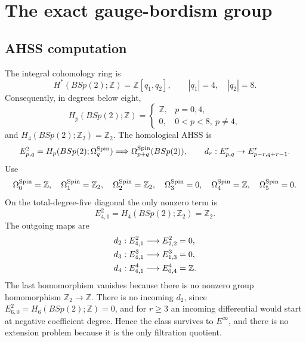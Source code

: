 \documentclass[11pt]{article}
\theoremstyle{definition}
\theoremstyle{remark}
\newcommand{\ZZ}{\mathbb Z}
\begin{document}
\section{The exact gauge-bordism group}

\subsection{AHSS computation}

The integral cohomology ring is
\begin{equation}
 H^*(BSp(2);\ZZ)=\ZZ[q_1,q_2],
 \qquad |q_1|=4,\quad |q_2|=8.
 \label{eq:bsp-cohomology}
\end{equation}
Consequently, in degrees below eight,
\begin{equation}
 H_p(BSp(2);\ZZ)=
 \begin{cases}
 \ZZ,&p=0,4,\\
 0,&0<p<8,\ p\ne4,
 \end{cases}
 \label{eq:bsp-homology}
\end{equation}
and \(H_4(BSp(2);\ZZ_2)=\ZZ_2\).  The homological AHSS is
\begin{equation}
 E^2_{p,q}=H_p(BSp(2);\Omega_q^{\rm Spin})
 \Longrightarrow\Omega_{p+q}^{\rm Spin}(BSp(2)),
 \qquad
 d_r:E^r_{p,q}\to E^r_{p-r,q+r-1}.
 \label{eq:ahss}
\end{equation}
Use
\begin{equation}
 \Omega_0^{\rm Spin}=\ZZ,\quad
 \Omega_1^{\rm Spin}=\ZZ_2,\quad
 \Omega_2^{\rm Spin}=\ZZ_2,\quad
 \Omega_3^{\rm Spin}=0,\quad
 \Omega_4^{\rm Spin}=\ZZ,\quad
 \Omega_5^{\rm Spin}=0.
 \label{eq:spin-coefficients}
\end{equation}
On the total-degree-five diagonal the only nonzero term is
\begin{equation}
 E^2_{4,1}=H_4(BSp(2);\ZZ_2)=\ZZ_2.
 \label{eq:unique-ahss-term}
\end{equation}
The outgoing maps are
\begin{align}
 d_2:E^2_{4,1}&\longrightarrow E^2_{2,2}=0,
 \notag\\
 d_3:E^3_{4,1}&\longrightarrow E^3_{1,3}=0,
 \notag\\
 d_4:E^4_{4,1}&\longrightarrow E^4_{0,4}=\ZZ.
 \label{eq:outgoing}
\end{align}
The last homomorphism vanishes because there is no nonzero group
homomorphism \(\ZZ_2\to\ZZ\).  There is no incoming \(d_2\), since
\(E^2_{6,0}=H_6(BSp(2);\ZZ)=0\), and for \(r\ge3\) an incoming
differential would start at negative coefficient degree.  Hence the class
survives to \(E^\infty\), and there is no extension problem because it is
the only filtration quotient.
\end{document}
